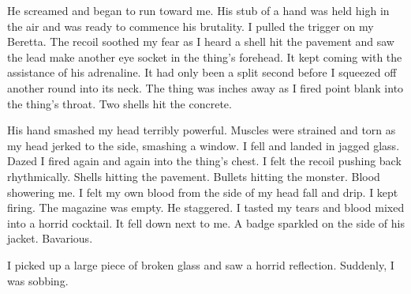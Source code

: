 He screamed and began to run toward me. His stub of a hand was held high
in the air and was ready to commence his brutality. I pulled the trigger
on my Beretta. The recoil soothed my fear as I heard a shell hit the
pavement and saw the lead make another eye socket in the thing's
forehead. It kept coming with the assistance of his adrenaline. It had
only been a split second before I squeezed off another round into its
neck. The thing was inches away as I fired point blank into the thing's
throat. Two shells hit the concrete.

His hand smashed my head terribly powerful. Muscles were strained and
torn as my head jerked to the side, smashing a window. I fell and landed
in jagged glass. Dazed I fired again and again into the thing's chest. I
felt the recoil pushing back rhythmically. Shells hitting the
pavement. Bullets hitting the monster. Blood showering me. I felt my own
blood from the side of my head fall and drip. I kept firing. The
magazine was empty. He staggered. I tasted my tears and blood mixed into
a horrid cocktail. It fell down next to me. A badge sparkled on the side
of his jacket. Bavarious.

I picked up a large piece of broken glass and saw a horrid
reflection. Suddenly, I was sobbing.

